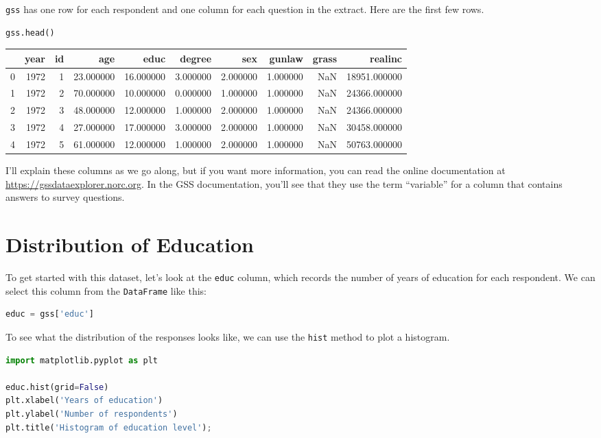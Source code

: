 \documentclass[
]{book}
\newcommand{\passthrough}[1]{#1}
\begin{document}
\passthrough{\lstinline!gss!} has one row for each respondent and one
column for each question in the extract. Here are the first few rows.

\begin{lstlisting}[language=Python]
gss.head()
\end{lstlisting}

\begin{tabular}{lrrrrrrrrr}
\toprule
 & year & id & age & educ & degree & sex & gunlaw & grass & realinc \\
\midrule
0 & 1972 & 1 & 23.000000 & 16.000000 & 3.000000 & 2.000000 & 1.000000 & NaN & 18951.000000 \\
1 & 1972 & 2 & 70.000000 & 10.000000 & 0.000000 & 1.000000 & 1.000000 & NaN & 24366.000000 \\
2 & 1972 & 3 & 48.000000 & 12.000000 & 1.000000 & 2.000000 & 1.000000 & NaN & 24366.000000 \\
3 & 1972 & 4 & 27.000000 & 17.000000 & 3.000000 & 2.000000 & 1.000000 & NaN & 30458.000000 \\
4 & 1972 & 5 & 61.000000 & 12.000000 & 1.000000 & 2.000000 & 1.000000 & NaN & 50763.000000 \\
\bottomrule
\end{tabular}

I'll explain these columns as we go along, but if you want more
information, you can read the online documentation at
\url{https://gssdataexplorer.norc.org}. In the GSS documentation, you'll
see that they use the term ``variable'' for a column that contains
answers to survey questions.

\section{Distribution of Education}\label{distribution-of-education}

To get started with this dataset, let's look at the
\passthrough{\lstinline!educ!} column, which records the number of years
of education for each respondent. We can select this column from the
\passthrough{\lstinline!DataFrame!} like this:

\begin{lstlisting}[language=Python]
educ = gss['educ']
\end{lstlisting}

To see what the distribution of the responses looks like, we can use the
\passthrough{\lstinline!hist!} method to plot a histogram.

\begin{lstlisting}[language=Python]
import matplotlib.pyplot as plt

educ.hist(grid=False)
plt.xlabel('Years of education')
plt.ylabel('Number of respondents')
plt.title('Histogram of education level');
\end{lstlisting}
\end{document}
